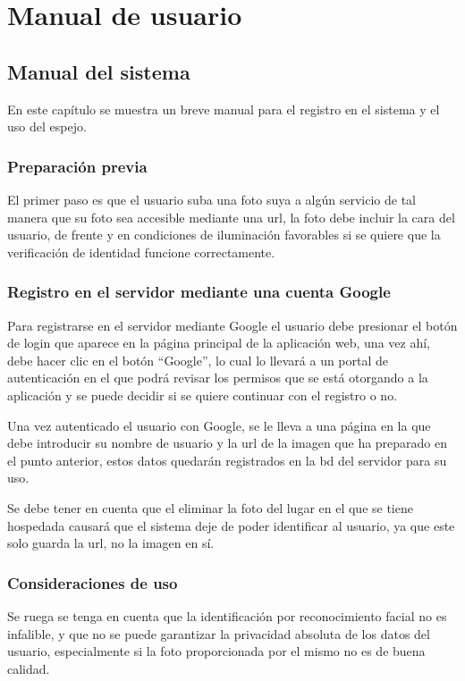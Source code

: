 \chapter{Manual de usuario}

\section{Manual del sistema}

En este capítulo se muestra un breve manual para el registro en el sistema y el uso del espejo.

\subsection{Preparación previa}

El primer paso es que el usuario suba una foto suya a algún servicio de tal manera que su foto sea accesible mediante una \acrshort{url}, la foto debe incluir la cara del usuario, de frente y en condiciones de iluminación favorables si se quiere que la verificación de identidad funcione correctamente.

\subsection{Registro en el servidor mediante una cuenta Google}

Para registrarse en el servidor mediante Google el usuario debe presionar el botón de login que aparece en la página principal de la aplicación web, una vez ahí, debe hacer clic en el botón “Google”, lo cual lo llevará a un portal de autenticación en el que podrá revisar los permisos que se está otorgando a la aplicación y se puede decidir si se quiere continuar con el registro o no.

Una vez autenticado el usuario con Google, se le lleva a una página en la que debe introducir su nombre de usuario y la \acrshort{url} de la imagen que ha preparado en el punto anterior, estos datos quedarán registrados en la \acrshort{bd} del servidor para su uso.

Se debe tener en cuenta que el eliminar la foto del lugar en el que se tiene hospedada causará que el sistema deje de poder identificar al usuario, ya que este solo guarda la \acrshort{url}, no la imagen en sí.

\subsection{Consideraciones de uso}

Se ruega se tenga en cuenta que la identificación por reconocimiento facial no es infalible, y que no se puede garantizar la privacidad absoluta de los datos del usuario, especialmente si la foto proporcionada por el mismo no es de buena calidad.